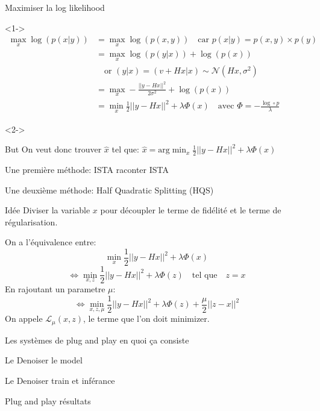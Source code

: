 \documentclass[11pt]{beamer}
\begin{document}
\begin{frame}{Maximiser la log likelihood}
    \begin{visibleenv}<1->
        \begin{align*}
            \max_x \log(p(x|y)) &= \max_x \log(p(x, y)) \quad \text{car } p(x|y) = p(x, y) \times p(y) \\
            &= \max_x \log(p(y|x)) + \log(p(x)) \\
            &\quad \text{or } (y|x) = (v+Hx|x) \sim \mathcal{N}(Hx, \sigma^2) \\
            &= \max_x -\frac{||y-Hx||^2}{2 \sigma^2} + \log(p(x)) \\
            &= \min_x \frac{1}{2}||y-Hx||^2 + \lambda \Phi(x) \quad \text{avec } \Phi = -\frac{\log \circ p}{\lambda}
        \end{align*}
    \end{visibleenv}

    \begin{visibleenv}<2->
        \begin{alertblock}{But}
            On veut donc trouver $\hat{x}$ tel que: $\hat{x} = \text{arg} \min_x \frac{1}{2}||y-Hx||^2 + \lambda \Phi(x)$
        \end{alertblock}
    \end{visibleenv}
\end{frame}

\begin{frame}{Une première méthode: ISTA}
    raconter ISTA
\end{frame}

\begin{frame}{Une deuxième méthode: Half Quadratic Splitting (HQS)}
    \begin{exampleblock}{Idée}
        Diviser la variable $x$ pour découpler le terme de fidélité et le terme de régularisation.
    \end{exampleblock}
    On a l'équivalence entre:
    $$ \min_x \frac{1}{2}||y-Hx||^2 + \lambda \Phi(x) $$
    $$ \Leftrightarrow \min_{x, z} \frac{1}{2}||y-Hx||^2 + \lambda \Phi(z) \quad \text{tel que} \quad  z=x$$
    En rajoutant un parametre $\mu$:
    $$ \Leftrightarrow \min_{x, z, \mu}  \frac{1}{2}||y-Hx||^2+\lambda \Phi(z) + \frac{\mu}{2}||z-x||^2 $$
    On appele $\mathcal{L}_{\mu}(x,z)$, le terme que l'on doit minimizer.
\end{frame}


\begin{frame}{Les systèmes de plug and play}
    en quoi ça consiste
\end{frame}

\begin{frame}{Le Denoiser}
    le model
\end{frame}

\begin{frame}{Le Denoiser}
    train et inférance
\end{frame}

\begin{frame}{Plug and play}
    résultats
\end{frame}
\end{document}
